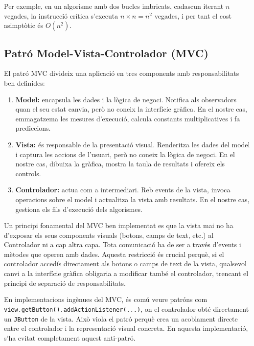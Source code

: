 \documentclass[conference,compsoc]{IEEEtran}
\begin{document}
Per exemple, en un algorisme amb dos bucles imbricats, cadascun iterant
$n$ vegades, la instrucció crítica s'executa $n \times n = n^2$ vegades,
i per tant el cost asimptòtic és $O(n^2)$.

\subsection{Patró Model-Vista-Controlador (MVC)}

El patró MVC divideix una aplicació en tres components
amb responsabilitats ben definides:

\begin{enumerate}
    \item \textbf{Model:} encapsula les dades i la lògica de negoci.
          Notifica als observadors quan el seu estat canvia, però no coneix
          la interfície gràfica. En el nostre cas, emmagatzema les mesures
          d'execució, calcula constants multiplicatives i fa prediccions.
    \item \textbf{Vista:} és responsable de la presentació visual.
          Renderitza les dades del model i captura les accions de l'usuari,
          però no coneix la lògica de negoci. En el nostre cas, dibuixa la
          gràfica, mostra la taula de resultats i ofereix els controls.
    \item \textbf{Controlador:} actua com a intermediari. Reb events
          de la vista, invoca operacions sobre el model i
          actualitza la vista amb resultats. En el nostre cas, gestiona
          els fils d'execució dels algorismes.
\end{enumerate}

Un principi fonamental del MVC ben implementat es que la vista mai
no ha d'exposar els seus components visuals (botons, camps de text, etc.)
al Controlador ni a cap altra capa. Tota comunicació ha de ser a través
d'events i mètodes que operen amb dades. Aquesta restricció és
crucial perquè, si el controlador accedís directament als botons o camps
de text de la vista, qualsevol canvi a la interfície gràfica obligaria a
modificar també el controlador, trencant el principi de separació de
responsabilitats.

En implementacions ingènues del MVC, és comú veure patróns com
\texttt{view.getButton().addActionListener(...)}, on el controlador
obté directament un \texttt{JButton} de la vista. Això viola el patró
perquè crea un acoblament directe entre el controlador i la representació
visual concreta. En aquesta implementació, s'ha evitat completament
aquest anti-patró.
\end{document}

